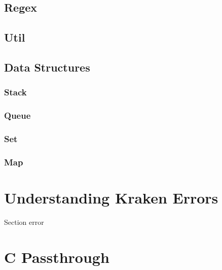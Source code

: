 \documentclass{article}
\begin{document}
  \subsection{Regex}
  \subsection{Util}
  \subsection{Data Structures}
    \subsubsection{Stack}
    \subsubsection{Queue}
    \subsubsection{Set}
    \subsubsection{Map}
\section{Understanding Kraken Errors}
  Section error
\section{C Passthrough}
\end{document}
